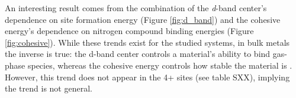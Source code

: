 An interesting result comes from the combination of the \textit{d}-band center's dependence on site formation energy (Figure \ref{fig:d_band}) and the cohesive energy's dependence on nitrogen compound binding energies (Figure \ref{fig:cohesive}). While these trends exist for the studied systems, in bulk metals the inverse is true: the d-band center controls a material's ability to bind gas-phase species, whereas the cohesive energy controls how stable the material is \cite{Hammer_1995}. However, this trend does not appear in the 4+ sites (see table SXX), implying the trend is not general.




